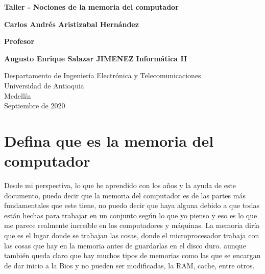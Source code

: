 \documentclass{article}
\begin{document}
\begin{titlepage}
    \begin{center}
        \vspace*{1cm}
            
        \Huge
        \textbf{Taller - Nociones de la memoria del computador}
            
        \vspace{0.5cm}
        \LARGE
            
        \vspace{1.5cm}
            
        \textbf{Carlos Andrés Aristizabal Hernández}
        
        \vspace{0.8cm}
        \textbf{Profesor}
        
            \textbf{
Augusto Enrique Salazar JIMENEZ }
        \vfill
        \textbf{Informática II} 
        \vspace{0.8cm}
       
        \Large
        Despartamento de Ingeniería Electrónica y Telecomunicaciones\\
        Universidad de Antioquia\\
        Medellín\\
        Septiembre de 2020
            
    \end{center}
\end{titlepage}

\tableofcontents
\newpage
\section{Defina que es la memoria del computador}\label{intro}
Desde mi perspectiva, lo que he aprendido con los años y la ayuda de este documento, puedo decir que la memoria del computador es de las partes más fundamentales
que este tiene, no puedo decir que haya alguna debido a que todas están hechas para trabajar en un conjunto según lo que yo pienso y eso es lo que me parece realmente
increíble en los computadores y máquinas.
La memoria diría que es el lugar donde se trabajan las cosas, donde el microprocesador trabaja con las cosas que hay en la memoria antes de guardarlas en el disco duro.
aunque también queda claro que hay muchos tipos de memorias como las que se encargan de dar inicio a la Bios y no pueden ser modificadas, la RAM, cache, entre otros.
\end{document}
